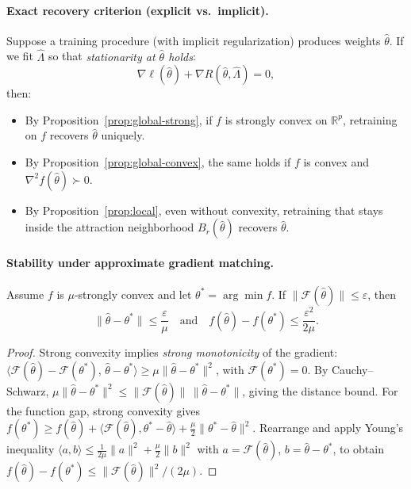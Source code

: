 \documentclass[10pt]{article}
\begin{document}
\paragraph{Exact recovery criterion (explicit vs.\ implicit).}
Suppose a training procedure (with implicit regularization) produces weights $\hat\theta$.
If we fit $\hat\Lambda$ so that \emph{stationarity at $\hat\theta$ holds}:
\[
\nabla \ell(\hat\theta) + \nabla R(\hat\theta,\hat\Lambda) = 0,
\]
then:
\begin{itemize}
\item By Proposition~\ref{prop:global-strong}, if $f$ is strongly convex on $\mathbb{R}^p$, retraining on $f$ recovers $\hat\theta$ uniquely.
\item By Proposition~\ref{prop:global-convex}, the same holds if $f$ is convex and $\nabla^2 f(\hat\theta)\succ0$.
\item By Proposition~\ref{prop:local}, even without convexity, retraining that stays inside the attraction neighborhood $B_r(\hat\theta)$ recovers $\hat\theta$.
\end{itemize}

\paragraph{Stability under approximate gradient matching.}
\begin{proposition}
\label{prop:stab}
Assume $f$ is $\mu$-strongly convex and let $\theta^*=\arg\min f$.
If $\|\mathcal{F}(\hat\theta)\|\le \varepsilon$, then
\[
\|\hat\theta-\theta^*\| \le \frac{\varepsilon}{\mu}
\quad\text{and}\quad
f(\hat\theta)-f(\theta^*) \le \frac{\varepsilon^2}{2\mu}.
\]
\end{proposition}

\begin{proof}
Strong convexity implies \emph{strong monotonicity} of the gradient:
$\langle \mathcal{F}(\hat\theta)-\mathcal{F}(\theta^*),\,\hat\theta-\theta^* \rangle \ge \mu \|\hat\theta-\theta^*\|^2$,
with $\mathcal{F}(\theta^*)=0$. By Cauchy–Schwarz,
$\mu \|\hat\theta-\theta^*\|^2 \le \|\mathcal{F}(\hat\theta)\|\,\|\hat\theta-\theta^*\|$,
giving the distance bound.
For the function gap, strong convexity gives
$f(\theta^*) \ge f(\hat\theta) + \langle \mathcal{F}(\hat\theta),\theta^*-\hat\theta\rangle + \tfrac{\mu}{2}\|\theta^*-\hat\theta\|^2$.
Rearrange and apply Young’s inequality
$\langle a,b\rangle \le \tfrac{1}{2\mu}\|a\|^2 + \tfrac{\mu}{2}\|b\|^2$ with $a=\mathcal{F}(\hat\theta)$, $b=\hat\theta-\theta^*$,
to obtain $f(\hat\theta)-f(\theta^*) \le \|\mathcal{F}(\hat\theta)\|^2/(2\mu)$.
\end{proof}
\end{document}
